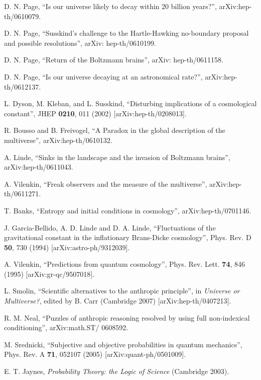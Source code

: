 \documentclass[pra,twocolumn,nofootinbib,eqsecnum,floatfix]{revtex4}
\begin{document}
\begin{thebibliography}{99}

D. N. Page, 
``Is our universe likely to decay within 20 billion years?'', 
arXiv:hep-th/0610079.

D. N. Page, 
``Susskind's challenge to the Hartle-Hawking no-boundary proposal and possible resolutions'',  
arXiv: hep-th/0610199.

D. N. Page, 
``Return of the Boltzmann brains'',
arXiv: hep-th/0611158. 

D. N. Page, 
``Is our universe decaying at an astronomical rate?'',
arXiv:hep-th/0612137. 

L. Dyson, M. Kleban, and L. Susskind, 
``Disturbing implications of a cosmological constant'', 
JHEP {\bf 0210}, 011 (2002)
[arXiv:hep-th/0208013]. 

R. Bousso and B. Freivogel, 
``A Paradox in the global description of the multiverse'', 
arXiv:hep-th/0610132. 

A. Linde, 
``Sinks in the landscape and the invasion of Boltzmann brains'', 
arXiv:hep-th/0611043. 

A. Vilenkin, 
``Freak observers and the measure of the multiverse'', 
arXiv:hep-th/0611271.

 T. Banks,
``Entropy and initial conditions in cosmology'',
arXiv:hep-th/0701146.

J. Garcia-Bellido, A. D. Linde and D. A. Linde, 
``Fluctuations of the gravitational constant in the inflationary Brans-Dicke cosmology'',
Phys. Rev. D {\bf 50}, 730 (1994) [arXiv:astro-ph/9312039].
 
A. Vilenkin,
``Predictions from quantum cosmology'',
Phys. Rev. Lett. {\bf 74}, 846 (1995) [arXiv:gr-qc/9507018].

L. Smolin,
``Scientific alternatives to the anthropic principle'',
in {\it Universe or Multiverse?}, edited by B. Carr 
(Cambridge 2007)
[arXiv:hep-th/0407213].

R. M. Neal,
``Puzzles of anthropic reasoning resolved by using full non-indexical conditioning'', 
arXiv:math.ST/ 0608592.

M. Srednicki, 
``Subjective and objective probabilities in quantum mechanics'',
Phys. Rev. A {\bf 71}, 052107 (2005) [arXiv:quant-ph/0501009].

E. T. Jaynes, 
{\it Probability Theory: the Logic of Science} (Cambridge 2003).


\end{thebibliography}
\end{document}
